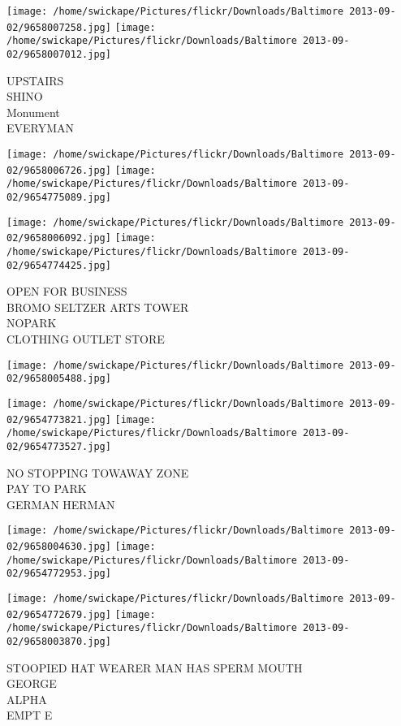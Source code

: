 \documentclass[10pt,letterpaper]{article}
\begin{document}
\texttt{[image: /home/swickape/Pictures/flickr/Downloads/Baltimore 2013-09-02/9658007258.jpg]}
\texttt{[image: /home/swickape/Pictures/flickr/Downloads/Baltimore 2013-09-02/9658007012.jpg]}

UPSTAIRS\\
SHINO\\
Monument\\
EVERYMAN
\pagebreak

\texttt{[image: /home/swickape/Pictures/flickr/Downloads/Baltimore 2013-09-02/9658006726.jpg]}
\texttt{[image: /home/swickape/Pictures/flickr/Downloads/Baltimore 2013-09-02/9654775089.jpg]}

\texttt{[image: /home/swickape/Pictures/flickr/Downloads/Baltimore 2013-09-02/9658006092.jpg]}
\texttt{[image: /home/swickape/Pictures/flickr/Downloads/Baltimore 2013-09-02/9654774425.jpg]}

OPEN FOR BUSINESS\\
BROMO SELTZER ARTS TOWER\\
NOPARK\\
CLOTHING OUTLET STORE
\pagebreak

\texttt{[image: /home/swickape/Pictures/flickr/Downloads/Baltimore 2013-09-02/9658005488.jpg]}

\vspace{0.25in}
\texttt{[image: /home/swickape/Pictures/flickr/Downloads/Baltimore 2013-09-02/9654773821.jpg]}
\texttt{[image: /home/swickape/Pictures/flickr/Downloads/Baltimore 2013-09-02/9654773527.jpg]}

NO STOPPING TOWAWAY ZONE\\
PAY TO PARK\\
GERMAN HERMAN
\pagebreak

\texttt{[image: /home/swickape/Pictures/flickr/Downloads/Baltimore 2013-09-02/9658004630.jpg]}
\texttt{[image: /home/swickape/Pictures/flickr/Downloads/Baltimore 2013-09-02/9654772953.jpg]}

\texttt{[image: /home/swickape/Pictures/flickr/Downloads/Baltimore 2013-09-02/9654772679.jpg]}
\texttt{[image: /home/swickape/Pictures/flickr/Downloads/Baltimore 2013-09-02/9658003870.jpg]}

STOOPIED HAT WEARER MAN HAS SPERM MOUTH\\
GEORGE\\
ALPHA\\
EMPT E
\pagebreak
\end{document}
